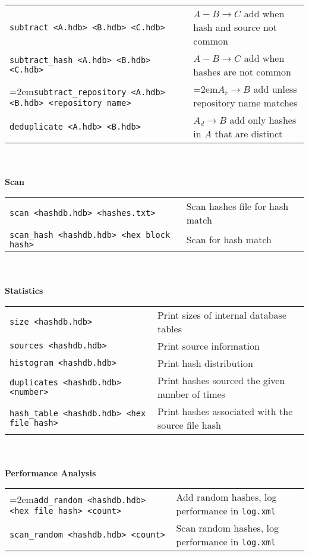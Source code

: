 \begin{footnotesize}
\begin{tabular}{p{3.6 in} p{3.0 in}}
\texttt{subtract <A.hdb> <B.hdb> <C.hdb>} & $A - B \rightarrow C$ add when hash and source not common\\
\texttt{subtract\_hash <A.hdb> <B.hdb> <C.hdb>} & $A - B \rightarrow C$ add when hashes are not common\\
\hangindent=2em\texttt{subtract\_repository <A.hdb> <B.hdb> <repository name>} & \hangindent=2em$A_{\overline{r}} \rightarrow B$ add unless repository name matches\\
\texttt{deduplicate <A.hdb> <B.hdb>} & $A_d \rightarrow B$ add only hashes in $A$ that are distinct\\
\end{tabular}
\\
\\
\textbf{Scan} \\
\begin{tabular}{p{3.6 in} p{3.0 in}}
\texttt{scan <hashdb.hdb> <hashes.txt>} & Scan hashes file for hash match \\
\texttt{scan\_hash <hashdb.hdb> <hex block hash>} & Scan for hash match \\
\end{tabular}
\\
\\
\textbf{Statistics}\\
\begin{tabular}{p{3.6 in} p{3.0 in}}
\texttt{size <hashdb.hdb>} & Print sizes of internal database tables \\
\texttt{sources <hashdb.hdb>} & Print source information \\
\texttt{histogram <hashdb.hdb>} & Print hash distribution \\
\texttt{duplicates <hashdb.hdb> <number>} & Print hashes sourced the given number of times \\
\texttt{hash\_table <hashdb.hdb> <hex file hash>} & Print hashes associated with the source file hash\\
\end{tabular}
\\
\\
\textbf{Performance Analysis}\\
\begin{tabular}{p{3.6 in} p{4 in}}
\hangindent=2em\texttt{add\_random <hashdb.hdb> <hex file hash> <count>} & Add random hashes, log performance in \texttt{log.xml}\\
\texttt{scan\_random <hashdb.hdb> <count>} & Scan random hashes, log performance in \texttt{log.xml}\\

\end{tabular}
\end{footnotesize}
